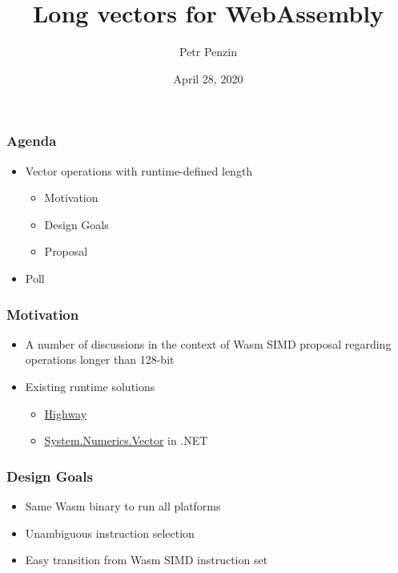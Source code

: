 \documentclass[t,aspectratio=169, xcolor={table}]{beamer}
\title{Long vectors for WebAssembly}
\author{Petr Penzin}
\institute{Intel Corporation}
\date{April 28, 2020}
\begin{document}
\begin{frame}
  \titlepage
\end{frame}
\begin{frame}
\frametitle{Agenda}

  \begin{itemize}
  \item Vector operations with runtime-defined length
    \begin{itemize}
    \item Motivation
    \item Design Goals
    \item Proposal
    \end{itemize}
  \item Poll
  \end{itemize}

\end{frame}
\begin{frame}
\frametitle{Motivation}
  \begin{itemize}
  \item A number of discussions in the context of Wasm SIMD proposal regarding operations longer than 128-bit\footnotemark[1]\footnotemark[2]
  \item Existing runtime solutions
    \begin{itemize}
    \item \href{https://github.com/google/highway}{Highway}
    \item \href{https://docs.microsoft.com/en-us/dotnet/api/system.numerics.vector}{System.Numerics.Vector} in .NET
    \end{itemize}
  \end{itemize}
\end{frame}
\begin{frame}
\frametitle{Design Goals}
  \begin{itemize}
  \item Same Wasm binary to run all platforms
  \item Unambiguous instruction selection
  \item Easy transition from Wasm SIMD instruction set
  \end{itemize}
\end{frame}
\end{document}
